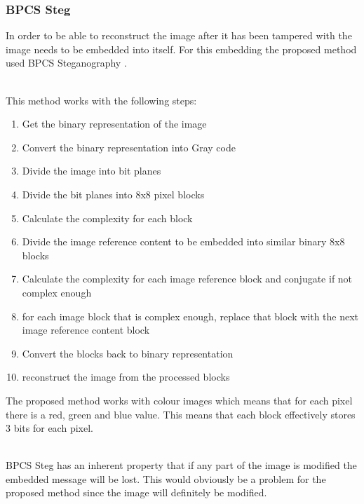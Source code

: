 \documentclass[12pt]{article}
\begin{document}
\subsubsection{BPCS Steg}
\label{bpcsSteg}
In order to be able to reconstruct the image after it has been tampered with the image needs to be embedded into itself. 
For this embedding the proposed method used BPCS Steganography \cite{beaullieubpcs}.

\hspace{0pt} \\
This method works with the following steps:
\begin{enumerate}
  \item Get the binary representation of the image
  \item Convert the binary representation into Gray code
  \item Divide the image into bit planes
  \item Divide the bit planes into 8x8 pixel blocks
  \item Calculate the complexity for each block
  \item Divide the image reference content to be embedded into similar binary 8x8 blocks
  \item Calculate the complexity for each image reference block and conjugate if not complex enough
  \item for each image block that is complex enough, replace that block with the next image reference content block
  \item Convert the blocks back to binary representation
  \item reconstruct the image from the processed blocks 
\end{enumerate}
The proposed method works with colour images which means that for each pixel there is a red, green and blue value. This means that each block effectively stores 3 bits for each pixel. 

\hspace{0pt} \\
BPCS Steg has an inherent property that if any part of the image is modified the embedded message will be lost.
This would obviously be a problem for the proposed method since the image will definitely be modified.
\end{document}
